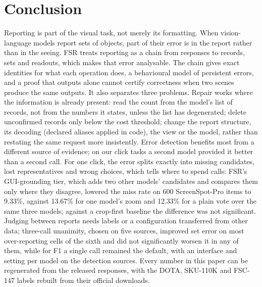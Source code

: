 \section{Conclusion}\label{sec:conclusion}

Reporting is part of the visual task, not merely its formatting. When vision-language models report sets of objects, part of their error is in the report rather than in the seeing. FSR treats reporting as a chain from responses to records, sets and readouts, which makes that error analysable. The chain gives exact identities for what each operation does, a behavioural model of persistent errors, and a proof that outputs alone cannot certify correctness when two scenes produce the same outputs. It also separates three problems. Repair works where the information is already present: read the count from the model's list of records, not from the numbers it states, unless the list has degenerated; delete unconfirmed records only below the cost threshold; change the report structure, its decoding (declared aliases applied in code), the view or the model, rather than restating the same request more insistently. Error detection benefits most from a different source of evidence; on our click tasks a second model provided it better than a second call. For one click, the error splits exactly into missing candidates, lost representatives and wrong choices, which tells where to spend calls: FSR's GUI-grounding tier, which adds two other models' candidates and compares them only where they disagree, lowered the miss rate on 600 ScreenSpot-Pro items to 9.33\%, against 13.67\% for one model's zoom and 12.33\% for a plain vote over the same three models; against a crop-first baseline the difference was not significant. Judging between reports needs labels or a configuration transferred from other data; three-call unanimity, chosen on five sources, improved set error on most over-reporting cells of the sixth and did not significantly worsen it in any of them, while for F1 a single call remained the default, with an interface and setting per model on the detection sources. Every number in this paper can be regenerated from the released responses, with the DOTA, SKU-110K and FSC-147 labels rebuilt from their official downloads.
